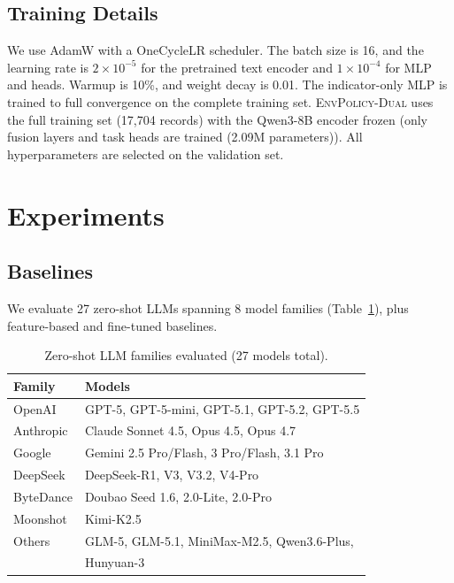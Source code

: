 \documentclass[11pt]{article}
\newcommand{\ours}{\textsc{EnvPolicy-Dual}}
\begin{document}
\subsection{Training Details}

We use AdamW with a OneCycleLR scheduler. The batch size is 16, and the learning rate is  $2\!\times\!10^{-5}$ for the pretrained text encoder and $1\!\times\!10^{-4}$ for MLP and heads. Warmup is 10\%, and weight decay is 0.01. The indicator-only MLP is trained to full convergence on the complete training set. \ours{} uses the
full training set (17{,}704 records) with the Qwen3-8B encoder frozen (only fusion layers and task heads are trained (2.09M parameters)). All hyperparameters are selected on the validation set.

\section{Experiments}
\label{sec:exp}

\subsection{Baselines}

We evaluate 27 zero-shot LLMs spanning 8 model families (Table~\ref{tab:models}),
plus feature-based and fine-tuned baselines.

\begin{table}[!t]
\centering\small
\setlength{\tabcolsep}{4pt}
\begin{tabular}{@{}ll@{}}
\toprule
\textbf{Family} & \textbf{Models} \\
\midrule
OpenAI      & GPT-5, GPT-5-mini, GPT-5.1, GPT-5.2, GPT-5.5 \\
Anthropic   & Claude Sonnet 4.5, Opus 4.5, Opus 4.7 \\
Google      & Gemini 2.5 Pro/Flash, 3 Pro/Flash, 3.1 Pro \\
DeepSeek    & DeepSeek-R1, V3, V3.2, V4-Pro \\
ByteDance   & Doubao Seed 1.6, 2.0-Lite, 2.0-Pro \\
Moonshot    & Kimi-K2.5 \\
Others      & GLM-5, GLM-5.1, MiniMax-M2.5, Qwen3.6-Plus, \\
            & Hunyuan-3 \\
\bottomrule
\end{tabular}
\caption{Zero-shot LLM families evaluated (27 models total).}
\label{tab:models}
\end{table}
\end{document}
